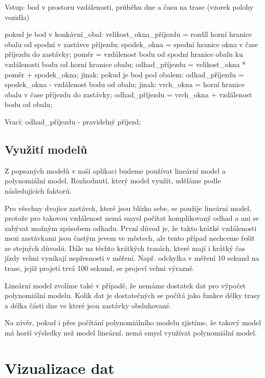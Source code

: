 \begin{code}[frame=none]
Vstup: bod v prostoru vzdálenosti, průběhu dne
  a času na trase (vzorek polohy vozidla)


pokud je bod v konkávní_obal:
  velikost_okna_příjezdu = rozdíl horní hranice obalu od spodní
    v zastávce příjezdu;
  spodek_okna = spodní hranice okna v čase
    příjezdu do zastávky;
  poměr = vzdálenost bodu od spodní hranice obalu
ku vzdálenosti bodu od horní hranice obalu;
  odhad_příjezdu = velikost_okna * poměr + spodek_okna;
jinak:
  pokud je bod pod obalem:
    odhad_příjezdu = spodek_okna - vzdálenost bodu od obalu;
  jinak:
    vrch_okna = horní hranice obalu
  v čase příjezdu do zastávky;
    odhad_příjezdu = vrch_okna + vzdálenost bodu od obalu;


Vrací: odhad_příjezdu - pravidelný příjezd;
\end{code}


\subsection{Využití modelů}


Z popsaných modelů v naší aplikaci budeme používat lineární model a polynomiální model. Rozhodnutí, který model využít, uděláme podle následujících faktorů.


\bigbreak


Pro všechny dvojice zastávek, které jsou blízko sebe, se použije lineární model, protože pro takovou vzdálenost nemá smysl počítat komplikovaný odhad a ani se zabývat možným způsobem odhadu. První důvod je, že takto krátké vzdálenosti mezi zastávkami jsou častým jevem ve městech, ale tento případ nechceme řešit ze stejných důvodů. Dále na těchto krátkých trasách, které mají i krátký čas jízdy velmi vynikají nepřesnosti v měření. Např. odchylka v měření 10 sekund na trase, jejíž projetí trvá 100 sekund, se projeví velmi výrazně.


\bigbreak


Lineární model zvolíme také v případě, že nemáme dostatek dat pro výpočet polynomiální modelu. Kolik dat je dostatečných se počítá jako funkce délky trasy a délka části dne ve které jsou zastávky obsluhované.


\bigbreak


Na závěr, pokud i přes počítání polynomiálního modelu zjistíme, že takový model má horší výsledky než model lineární, nemá smysl využívat polynomiální model.


\section{Vizualizace dat} \label{section:navrh_vizualizace}


